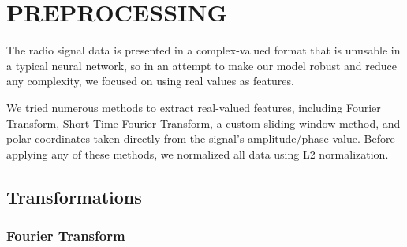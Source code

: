 \documentclass{turabian-thesis}[12pt]
\begin{document}


\chapter{PREPROCESSING}
\label{preprocessing}

The radio signal data is presented in a complex-valued format that is unusable in a typical neural network, so in an attempt to make our model robust and reduce any complexity, we focused on using real values as features.

We tried numerous methods to extract real-valued features, including Fourier Transform, Short-Time Fourier Transform, a custom sliding window method, and polar coordinates taken directly from the signal's amplitude/phase value. Before applying any of these methods, we normalized all data using L2 normalization.




\section{Transformations}


\subsection{Fourier Transform}
\end{document}

